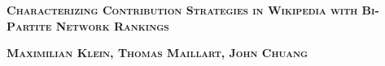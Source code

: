 \documentclass[letterpaper,10pt,a4paper]{article}
\begin{document}
\begin{center}






  

\vspace{-0.5cm}
{\Large {\bf \textsc{Characterizing Contribution Strategies in Wikipedia with Bi-Partite Network Rankings\\}}}

\vspace{0.2cm}
{\large {\bf \textsc{Maximilian Klein, Thomas Maillart, John Chuang}}}
\vspace{0.15cm}
\end{center}

\vspace{0.05cm}
\end{document}
